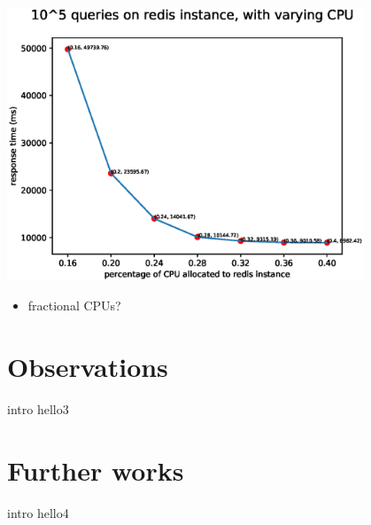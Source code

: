 \documentclass{beamer}
\begin{document}
\begin{frame}
\begin{center}
    \includegraphics[width=0.8\textwidth]{fig4.eps}
\end{center}
    \begin{itemize}
        \item fractional CPUs?
    \end{itemize}
\end{frame}

\section{Observations}
\begin{frame}{intro}
hello3
\end{frame}


\section{Further works}
\begin{frame}{intro}
hello4
\end{frame}
\end{document}
